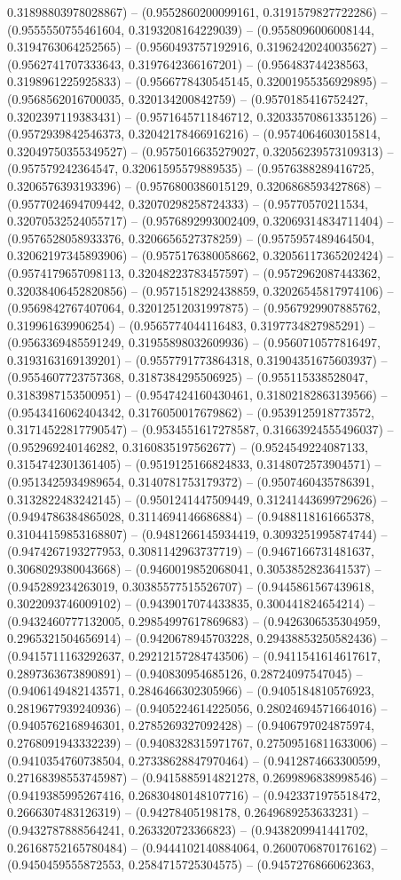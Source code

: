 0.31898803978028867) -- (0.9552860200099161, 0.3191579827722286) -- (0.9555550755461604, 0.3193208164229039) -- (0.9558096006008144, 0.3194763064252565) -- (0.9560493757192916, 0.31962420240035627) -- (0.9562741707333643, 0.3197642366167201) -- (0.956483744238563, 0.3198961225925833) -- (0.9566778430545145, 0.32001955356929895) -- (0.9568562016700035, 0.320134200842759) -- (0.9570185416752427, 0.3202397119383431) -- (0.9571645711846712, 0.32033570861335126) -- (0.9572939842546373, 0.32042178466916216) -- (0.9574064603015814, 0.32049750355349527) -- (0.9575016635279027, 0.32056239573109313) -- (0.957579242364547, 0.32061595579889535) -- (0.9576388289416725, 0.3206576393193396) -- (0.9576800386015129, 0.3206868593427868) -- (0.9577024694709442, 0.32070298258724333) -- (0.95770570211534, 0.32070532524055717) -- (0.9576892993002409, 0.32069314834711404) -- (0.9576528058933376, 0.3206656527378259) -- (0.9575957489464504, 0.32062197345893906) -- (0.9575176380058662, 0.32056117365202424) -- (0.9574179657098113, 0.32048223783457597) -- (0.9572962087443362, 0.32038406452820856) -- (0.9571518292438859, 0.32026545817974106) -- (0.9569842767407064, 0.32012512031997875) -- (0.9567929907885762, 0.319961639906254) -- (0.9565774044116483, 0.3197734827985291) -- (0.9563369485591249, 0.31955898032609936) -- (0.9560710577816497, 0.3193163169139201) -- (0.9557791773864318, 0.31904351675603937) -- (0.9554607723757368, 0.3187384295506925) -- (0.955115338528047, 0.3183987153500951) -- (0.9547424160430461, 0.31802182863139566) -- (0.9543416062404342, 0.3176050017679862) -- (0.9539125918773572, 0.31714522817790547) -- (0.9534551617278587, 0.31663924555496037) -- (0.952969240146282, 0.3160835197562677) -- (0.9524549224087133, 0.3154742301361405) -- (0.9519125166824833, 0.3148072573904571) -- (0.9513425934989654, 0.3140781753179372) -- (0.9507460435786391, 0.3132822483242145) -- (0.9501241447509449, 0.31241443699729626) -- (0.9494786384865028, 0.3114694146686884) -- (0.9488118161665378, 0.31044159853168807) -- (0.9481266145934419, 0.3093251995874744) -- (0.9474267193277953, 0.3081142963737719) -- (0.9467166731481637, 0.3068029380043668) -- (0.9460019852068041, 0.3053852823641537) -- (0.945289234263019, 0.30385577515526707) -- (0.9445861567439618, 0.3022093746009102) -- (0.9439017074433835, 0.300441824654214) -- (0.9432460777132005, 0.29854997617869683) -- (0.9426306535304959, 0.2965321504656914) -- (0.9420678945703228, 0.29438853250582436) -- (0.9415711163292637, 0.29212157284743506) -- (0.9411541614617617, 0.2897363673890891) -- (0.940830954685126, 0.28724097547045) -- (0.9406149482143571, 0.2846466302305966) -- (0.9405184810576923, 0.2819677939240936) -- (0.9405224614225056, 0.28024694571664016) -- (0.9405762168946301, 0.2785269327092428) -- (0.9406797024875974, 0.2768091943332239) -- (0.9408328315971767, 0.27509516811633006) -- (0.9410354760738504, 0.27338628847970464) -- (0.9412874663300599, 0.27168398553745987) -- (0.9415885914821278, 0.2699896838998546) -- (0.9419385995267416, 0.26830480148107716) -- (0.9423371975518472, 0.2666307483126319) -- (0.94278405198178, 0.2649689253633231) -- (0.9432787888564241, 0.263320723366823) -- (0.9438209941441702, 0.26168752165780484) -- (0.9444102140884064, 0.2600706870176162) -- (0.9450459555872553, 0.2584715725304575) -- (0.9457276866062363, 